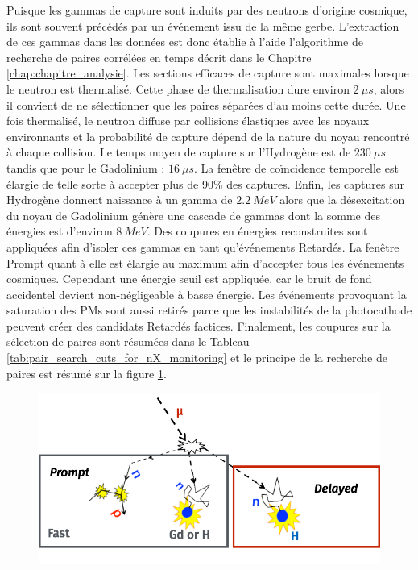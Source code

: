 Puisque les gammas de capture sont induits par des neutrons d'origine cosmique, ils sont souvent précédés par un événement issu de la même gerbe. L'extraction de ces gammas dans les données est donc établie à l'aide l'algorithme de recherche de paires corrélées en temps décrit dans le Chapitre \ref{chap:chapitre_analysie}. Les sections efficaces de capture sont maximales lorsque le neutron est thermalisé. Cette phase de thermalisation dure environ $\SI{2}{\mu s}$, alors il convient de ne sélectionner que les paires séparées d'au moins cette durée. Une fois thermalisé, le neutron diffuse par collisions élastiques avec les noyaux environnants et la probabilité de capture dépend de la nature du noyau rencontré à chaque collision. Le temps moyen de capture sur l'Hydrogène est de $\SI{230}{\mu s}$ tandis que pour le Gadolinium : $\SI{16}{\mu s}$. La fenêtre de coïncidence temporelle est élargie de telle sorte à accepter plus de 90\% des captures. Enfin, les captures sur Hydrogène donnent naissance à un gamma de $\SI{2.2}{MeV}$ alors que la désexcitation du noyau de Gadolinium génère une cascade de gammas dont la somme des énergies est d'environ $\SI{8}{MeV}$. Des coupures en énergies reconstruites sont appliquées afin d'isoler ces gammas en tant qu'événements Retardés. La fenêtre Prompt quant à elle est élargie au maximum afin d'accepter tous les événements cosmiques. Cependant une énergie seuil est appliquée, car le bruit de fond accidentel devient non-négligeable à basse énergie. Les événements provoquant la saturation des PMs sont aussi retirés parce que les instabilités de la photocathode peuvent créer des candidats Retardés factices. Finalement, les coupures sur la sélection de paires sont résumées dans le Tableau \ref{tab:pair_search_cuts_for_nX_monitoring} et le principe de la recherche de paires est résumé sur la figure \ref{fig:Hcapture}.\\

\begin{figure}[h!]
  \centering
  \includegraphics[width=0.8\linewidth]{images/Hcapture}
  \label{fig:Hcapture}
\end{figure}

